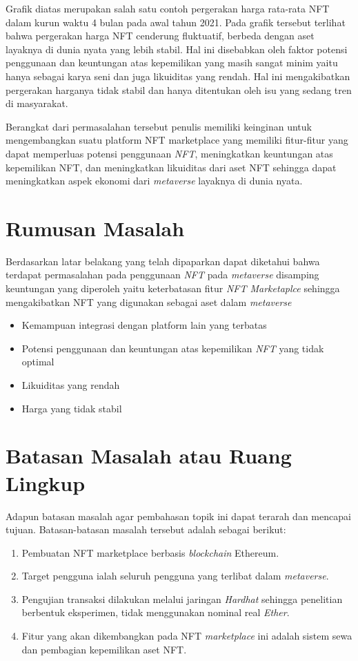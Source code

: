 Grafik diatas merupakan salah satu contoh pergerakan harga rata-rata NFT dalam kurun waktu 4 bulan pada awal tahun 2021. Pada grafik tersebut terlihat bahwa pergerakan harga NFT cenderung fluktuatif, berbeda dengan aset layaknya di dunia nyata yang lebih stabil. Hal ini disebabkan oleh faktor potensi penggunaan dan keuntungan atas kepemilikan yang masih sangat minim yaitu hanya sebagai karya seni dan juga likuiditas yang rendah. 
Hal ini mengakibatkan pergerakan harganya tidak stabil dan hanya ditentukan oleh isu yang sedang tren di masyarakat.

Berangkat dari permasalahan tersebut penulis memiliki keinginan untuk mengembangkan suatu platform NFT marketplace yang memiliki fitur-fitur yang dapat memperluas potensi penggunaan \emph{NFT}, meningkatkan keuntungan atas kepemilikan NFT, dan meningkatkan likuiditas dari aset NFT sehingga dapat meningkatkan aspek ekonomi dari \emph{metaverse} layaknya di dunia nyata. 

\section{Rumusan Masalah}
Berdasarkan latar belakang yang telah dipaparkan dapat diketahui bahwa terdapat permasalahan pada penggunaan \emph{NFT} pada \emph{metaverse} disamping keuntungan yang diperoleh yaitu keterbatasan fitur \emph{NFT Marketaplce} sehingga mengakibatkan NFT yang digunakan sebagai aset dalam \emph{metaverse}
\begin{itemize}
  \item Kemampuan integrasi dengan platform lain yang terbatas
  \item Potensi penggunaan dan keuntungan atas kepemilikan \emph{NFT} yang tidak optimal
  \item Likuiditas yang rendah
  \item Harga yang tidak stabil
\end{itemize}

\section{Batasan Masalah atau Ruang Lingkup}

Adapun batasan masalah agar pembahasan topik ini dapat terarah dan mencapai tujuan. Batasan-batasan masalah tersebut adalah sebagai berikut:
\begin{enumerate}
  \item Pembuatan NFT marketplace berbasis \emph{blockchain} Ethereum.
  \item Target pengguna ialah seluruh pengguna yang terlibat dalam \emph{metaverse}.
  \item Pengujian transaksi dilakukan melalui jaringan \emph{Hardhat} sehingga penelitian berbentuk eksperimen, tidak menggunakan nominal real \emph{Ether}.
  \item Fitur yang akan dikembangkan pada NFT \emph{marketplace} ini adalah sistem sewa dan pembagian kepemilikan aset NFT.
\end{enumerate}

